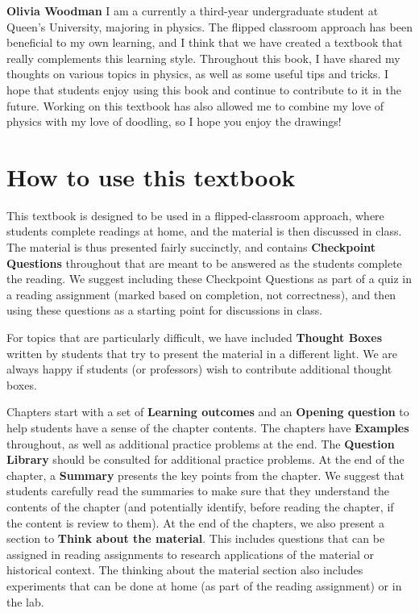 \textbf{Olivia Woodman} I am a currently a third-year undergraduate student at Queen's University, majoring in physics. The flipped classroom approach has been beneficial to my own learning, and I think that we have created a textbook that really complements this learning style. Throughout this book, I have shared my thoughts on various topics in physics, as well as some useful tips and tricks. I hope that students enjoy using this book and continue to contribute to it in the future. Working on this textbook has also allowed me to combine my love of physics with my love of doodling, so I hope you enjoy the drawings!

\section*{How to use this textbook}
This textbook is designed to be used in a flipped-classroom approach, where students complete readings at home, and the material is then discussed in class. The material is thus presented fairly succinctly, and contains \textbf{Checkpoint Questions} throughout that are meant to be answered as the students complete the reading. We suggest including these Checkpoint Questions as part of a quiz in a reading assignment (marked based on completion, not correctness), and then using these questions as a starting point for discussions in class.

For topics that are particularly difficult, we have included \textbf{Thought Boxes} written by students that try to present the material in a different light. We are always happy if students (or professors) wish to contribute additional thought boxes.

Chapters start with a set of \textbf{Learning outcomes} and an \textbf{Opening question} to help students have a sense of the chapter contents. The chapters have \textbf{Examples} throughout, as well as additional practice problems at the end. The \textbf{Question Library} should be consulted for additional practice problems. At the end of the chapter, a \textbf{Summary} presents the key points from the chapter. We suggest that students carefully read the summaries to make sure that they understand the contents of the chapter (and potentially identify, before reading the chapter, if the content is review to them). At the end of the chapters, we also present a section to \textbf{Think about the material}. This includes questions that can be assigned in reading assignments to research applications of the material or historical context. The thinking about the material section also includes experiments that can be done at home (as part of the reading assignment) or in the lab.

